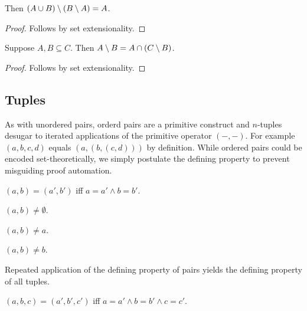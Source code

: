 \begin{proposition}\label{double_complement_union}
    Then $(A\cup B)\setminus (B\setminus A) = A$.
\end{proposition}
\begin{proof}
    Follows by set extensionality.
\end{proof}

\begin{proposition}\label{setminus_eq_inter_complement}
    Suppose $A, B\subseteq C$.
    Then $A\setminus B = A\cap (C\setminus B)$.
\end{proposition}
\begin{proof}
    Follows by set extensionality.
\end{proof}

\subsection{Tuples}

As with unordered pairs,
orderd pairs are a primitive construct and
$n$-tuples desugar to iterated applications of the
primitive operator $({-},{-})$.
For example $(a, b, c, d)$ equals $(a, (b, (c, d)))$ by definition.
While ordered pairs could be encoded set-theoretically, %
we simply postulate the defining property to prevent misguiding
proof automation.

\begin{axiom}\label{pair_eq_iff}
    $(a, b) = (a', b')$ iff $a = a'\land b = b'$.
\end{axiom}

\begin{axiom}\label{pair_neq_emptyset}
    $(a, b) \neq \emptyset$.
\end{axiom}

\begin{axiom}\label{pair_neq_fst}
    $(a, b) \neq a$.
\end{axiom}

\begin{axiom}\label{pair_neq_snd}
    $(a, b) \neq b$.
\end{axiom}

Repeated application of the defining property of pairs yields the defining property of
all tuples.

\begin{proposition}\label{triple_eq_iff}
    $(a, b, c) = (a', b', c')$ iff $a = a' \land b = b'\land c = c'$.
\end{proposition}

